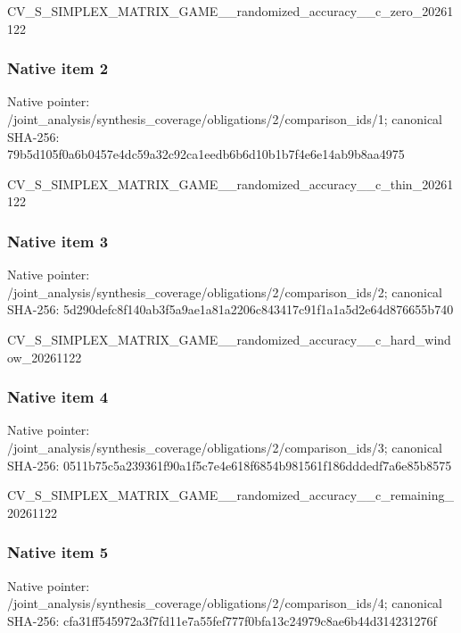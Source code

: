 \documentclass[10pt,a4paper]{article}
\begin{document}
CV\_S\_SIMPLEX\_MATRIX\_GAME\allowbreak{}\_\_randomized\_accuracy\_\_c\allowbreak{}\_zero\_20261122


\subsubsection{Native item 2}


Native pointer: /joint\_analysis/synthesi\allowbreak{}s\_coverage/obligations/2\allowbreak{}/comparison\_ids/1; canonical SHA-256: 79b5d105f0a6b0457e4dc59a\allowbreak{}32c92ca1eedb6b6d10b1b7f4\allowbreak{}e6e14ab9b8aa4975


CV\_S\_SIMPLEX\_MATRIX\_GAME\allowbreak{}\_\_randomized\_accuracy\_\_c\allowbreak{}\_thin\_20261122


\subsubsection{Native item 3}


Native pointer: /joint\_analysis/synthesi\allowbreak{}s\_coverage/obligations/2\allowbreak{}/comparison\_ids/2; canonical SHA-256: 5d290defc8f140ab3f5a9ae1\allowbreak{}a81a2206c843417c91f1a1a5\allowbreak{}d2e64d876655b740


CV\_S\_SIMPLEX\_MATRIX\_GAME\allowbreak{}\_\_randomized\_accuracy\_\_c\allowbreak{}\_hard\_window\_20261122


\subsubsection{Native item 4}


Native pointer: /joint\_analysis/synthesi\allowbreak{}s\_coverage/obligations/2\allowbreak{}/comparison\_ids/3; canonical SHA-256: 0511b75c5a239361f90a1f5c\allowbreak{}7e4e618f6854b981561f186d\allowbreak{}ddedf7a6e85b8575


CV\_S\_SIMPLEX\_MATRIX\_GAME\allowbreak{}\_\_randomized\_accuracy\_\_c\allowbreak{}\_remaining\_20261122


\subsubsection{Native item 5}


Native pointer: /joint\_analysis/synthesi\allowbreak{}s\_coverage/obligations/2\allowbreak{}/comparison\_ids/4; canonical SHA-256: cfa31ff545972a3f7fd11e7a\allowbreak{}55fef777f0bfa13c24979c8a\allowbreak{}e6b44d314231276f
\end{document}
